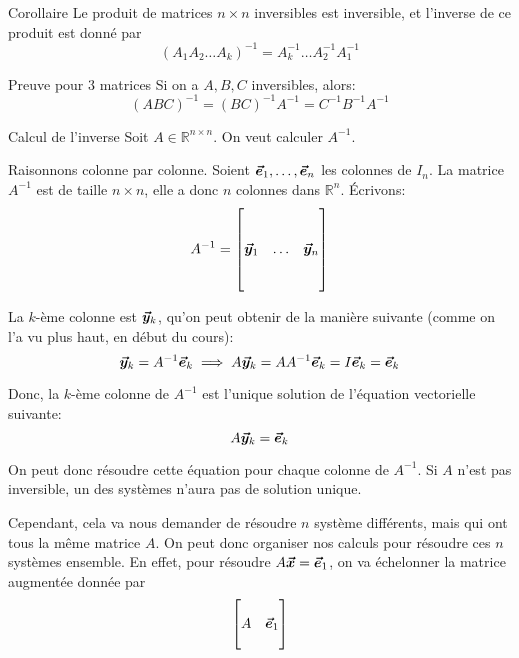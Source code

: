 \documentclass[a4paper]{article}
\begin{document}
\begin{parag}{Corollaire}
    Le produit de matrices $n \times n$ inversibles est inversible, et l'inverse de ce produit est donné par
    \[\left(A_1 A_2 \ldots A_k\right)^{-1} = A_k^{-1} \ldots A_2^{-1} A_1^{-1}\]

    \begin{subparag}{Preuve pour 3 matrices}
        Si on a $A, B, C$ inversibles, alors:
        \[\left(ABC\right)^{-1} = \left(BC\right)^{-1} A^{-1} = C^{-1} B^{-1} A^{-1}\]
    \end{subparag}
\end{parag}

\begin{parag}{Calcul de l'inverse}
    Soit $A \in \mathbb{R}^{n\times n}$. On veut calculer $A^{-1}$.

    Raisonnons colonne par colonne. Soient $\bm{\protect\vec{e}}_1, \ldots, \bm{\protect\vec{e}}_n$ les colonnes de $I_n$. La matrice $A^{-1}$ est de taille $n \times n$, elle a donc $n$ colonnes dans $\mathbb{R}^n$. Écrivons:
    \[A^{-1} = \begin{bmatrix}  &  &  \\  &  &  \\ \bm{\protect\vec{y}}_1 & \ldots & \bm{\protect\vec{y}}_n \\  &  &  \\  &  &  \end{bmatrix} \]

    La $k$-ème colonne est $\bm{\protect\vec{y}}_k$, qu'on peut obtenir de la manière suivante (comme on l'a vu plus haut, en début du cours):
    \[\bm{\protect\vec{y}}_k = A^{-1} \bm{\protect\vec{e}}_k \implies A \bm{\protect\vec{y}}_k = A A^{-1} \bm{\protect\vec{e}}_k = I \bm{\protect\vec{e}}_k = \bm{\protect\vec{e}}_k\]

    Donc, la $k$-ème colonne de $A^{-1}$ est l'unique solution de l'équation vectorielle suivante:
    \[A \bm{\protect\vec{y}}_k = \bm{\protect\vec{e}}_k\]

    On peut donc résoudre cette équation pour chaque colonne de $A^{-1}$. Si $A$ n'est pas inversible, un des systèmes n'aura pas de solution unique.

    Cependant, cela va nous demander de résoudre $n$ système différents, mais qui ont tous la même matrice $A$. On peut donc organiser nos calculs pour résoudre ces $n$ systèmes ensemble. En effet, pour résoudre $A \bm{\protect\vec{x}} = \bm{\protect\vec{e}}_1$, on va échelonner la matrice augmentée donnée par
    \[\begin{bmatrix}  &  \\ A & \bm{\protect\vec{e}}_1 \\  &  \end{bmatrix} \]


\end{parag}
\end{document}
